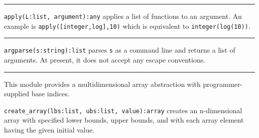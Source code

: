 % 
% 

\vspace{0.25cm}\hrule{}

\texttt{apply(L:list, argument):any} applies a list of
functions to an argument. An example is
\texttt{apply([integer,log],10)} which is equivalent to
\texttt{integer(log(10))}. 

\vspace{0.25cm}\hrule{}

\texttt{argparse(s:string):list} parses \texttt{s} as a
command line and returns a list of arguments. At
present, it does not accept any escape conventions. 

\vspace{0.25cm}\hrule{}

This module provides a multidimensional
array abstraction with programmer-supplied base indices.

\texttt{create\_array(lbs:list, ubs:list, value):array} creates an
n-dimensional array with specified lower bounds, upper bounds, and with
each array element having the given initial value.


